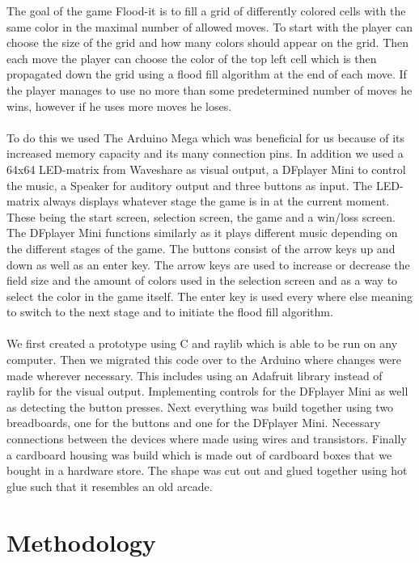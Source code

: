 \documentclass[10pt, a4paper]{article}
\begin{document}
The goal of the game Flood-it is to fill a grid of differently colored cells with the same color in the maximal number of allowed moves. To start with the player can choose the size of the grid and how many colors should appear on the grid. Then each move the player can choose the color of the top left cell which is then propagated down the grid using a flood fill algorithm at the end of each move. If the player manages to use no more than some predetermined number of moves he wins, however if he uses more moves he loses.\\\\
To do this we used The Arduino Mega which was beneficial for us because of its increased memory capacity and its many connection pins. In addition we used a 64x64 LED-matrix from Waveshare as visual output, a DFplayer Mini to control the music, a Speaker for auditory output and three buttons as input. The LED-matrix always displays whatever stage the game is in at the current moment. These being the start screen, selection screen, the game and a win/loss screen. The DFplayer Mini functions similarly as it plays different music depending on the different stages of the game. The buttons consist of the arrow keys up and down as well as an enter key. The arrow keys are used to increase or decrease the field size and the amount of colors used in the selection screen and as a way to select the color in the game itself. The enter key is used every where else meaning to switch to the next stage and to initiate the flood fill algorithm.\\\\
We first created a prototype using C and raylib which is able to be run on any computer. Then we migrated this code over to the Arduino where changes were made wherever necessary. This includes using an Adafruit library instead of raylib for the visual output. Implementing controls for the DFplayer Mini as well as detecting the button presses. Next everything was build together using two breadboards, one for the buttons and one for the DFplayer Mini. Necessary connections between the devices where made using wires and transistors. Finally a cardboard housing was build which is made out of cardboard boxes that we bought in a hardware store. The shape was cut out and glued together using hot glue such that it resembles an old arcade.

\section*{Methodology}
\end{document}
